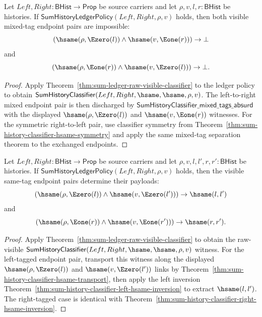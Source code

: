 \begin{theorem}
\label{thm:sum-ledger-visible-tag-separation}
Let $Left,Right:\mathsf{BHist}\to\mathsf{Prop}$ be source carriers and let
$\rho,v,l,r:\mathsf{BHist}$ be histories. If
$\mathsf{SumHistoryLedgerPolicy}(Left,Right,\rho,v)$ holds, then both visible
mixed-tag endpoint pairs are impossible:
$$
(\hsame(\rho,\Ezero(l))\land \hsame(v,\Eone(r)))\to\bot
$$
and
$$
(\hsame(\rho,\Eone(r))\land \hsame(v,\Ezero(l)))\to\bot.
$$
\end{theorem}
\begin{proof}
Apply Theorem~\ref{thm:sum-ledger-raw-visible-classifier} to the ledger policy
to obtain
$\mathsf{SumHistoryClassifier}(Left,Right,\hsame,\hsame,\rho,v)$. The
left-to-right mixed endpoint pair is then discharged by
$\mathsf{SumHistoryClassifier\_mixed\_tags\_absurd}$ with the displayed
$\hsame(\rho,\Ezero(l))$ and $\hsame(v,\Eone(r))$ witnesses. For the symmetric
right-to-left pair, use classifier symmetry from
Theorem~\ref{thm:sum-history-classifier-hsame-symmetry} and apply the same mixed-tag
separation theorem to the exchanged endpoints.
\end{proof}

\begin{theorem}
\label{thm:sum-ledger-same-tag-payload-exactness}
Let $Left,Right:\mathsf{BHist}\to\mathsf{Prop}$ be source carriers and let
$\rho,v,l,l',r,r':\mathsf{BHist}$ be histories. If
$\mathsf{SumHistoryLedgerPolicy}(Left,Right,\rho,v)$ holds, then the visible
same-tag endpoint pairs determine their payloads:
$$
(\hsame(\rho,\Ezero(l))\land\hsame(v,\Ezero(l')))\to\hsame(l,l')
$$
and
$$
(\hsame(\rho,\Eone(r))\land\hsame(v,\Eone(r')))\to\hsame(r,r').
$$
\end{theorem}
\begin{proof}
Apply Theorem~\ref{thm:sum-ledger-raw-visible-classifier} to obtain the
raw-visible $\mathsf{SumHistoryClassifier}(Left,Right,\hsame,\hsame,\rho,v)$
witness. For the left-tagged endpoint pair, transport this witness along the
displayed $\hsame(\rho,\Ezero(l))$ and $\hsame(v,\Ezero(l'))$ links by
Theorem~\ref{thm:sum-history-classifier-hsame-transport}, then apply the
left inversion Theorem~\ref{thm:sum-history-classifier-left-hsame-inversion}
to extract $\hsame(l,l')$. The right-tagged case is identical with
Theorem~\ref{thm:sum-history-classifier-right-hsame-inversion}.
\end{proof}

